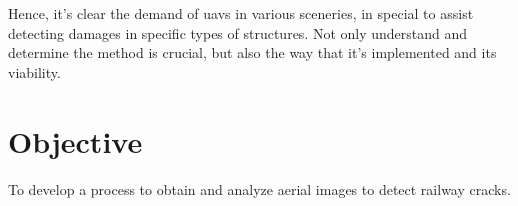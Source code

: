 Hence, it's clear the demand of \glspl*{uav} in various sceneries, in special to assist detecting damages in specific types of structures. Not only understand and determine the method is crucial, but also the way that it's implemented and its viability.

\section{Objective}\label{sec:objective}

To develop a process to obtain and analyze aerial images to detect railway cracks.





